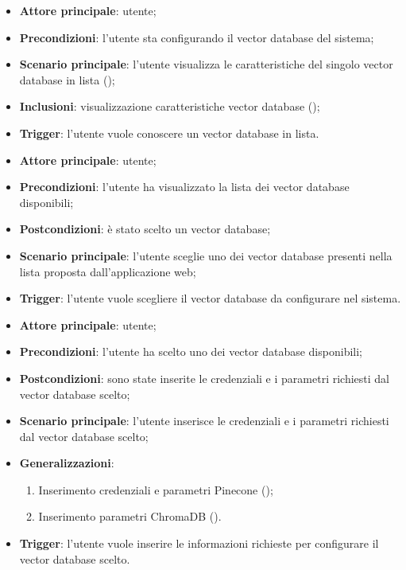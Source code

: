 \documentclass[10pt, a4paper]{article}
\begin{document}
    \begin{itemize}
        \item \textbf{Attore principale}: utente;
        \item \textbf{Precondizioni}: l’utente sta configurando il vector database del sistema;
        \item \textbf{Scenario principale}: l'utente visualizza le caratteristiche del singolo vector database in lista ();
        \item \textbf{Inclusioni}: visualizzazione caratteristiche vector database ();
        \item \textbf{Trigger}: l’utente vuole conoscere un vector database in lista.
    \end{itemize}

    \begin{itemize}
        \item \textbf{Attore principale}: utente;
        \item \textbf{Precondizioni}: l’utente ha visualizzato la lista dei vector database disponibili;
        \item \textbf{Postcondizioni}: è stato scelto un vector database;
        \item \textbf{Scenario principale}: l’utente sceglie uno dei vector database presenti nella lista proposta dall’applicazione web;
        \item \textbf{Trigger}: l’utente vuole scegliere il vector database da configurare nel sistema.
    \end{itemize}

    \begin{itemize}
        \item \textbf{Attore principale}: utente;
        \item \textbf{Precondizioni}: l’utente ha scelto uno dei vector database disponibili;
        \item \textbf{Postcondizioni}: sono state inserite le credenziali e i parametri richiesti dal vector database scelto;
        \item \textbf{Scenario principale}: l’utente inserisce le credenziali e i parametri richiesti dal vector database scelto;
        \item \textbf{Generalizzazioni}:
            \begin{enumerate}
                \item Inserimento credenziali e parametri Pinecone ();
                \item Inserimento parametri ChromaDB ().
            \end{enumerate}
        \item \textbf{Trigger}: l’utente vuole inserire le informazioni richieste per configurare il vector database scelto.
    \end{itemize}
\end{document}
